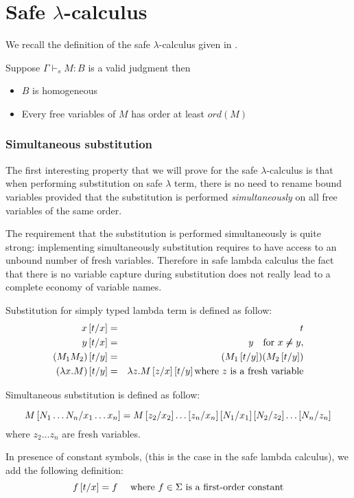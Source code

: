 \chapter{Safe $\lambda$-calculus}

We recall the definition of the safe $\lambda$-calculus given in
\cite{Ong2005}.




\begin{lem}
\label{lem:safe_basic_prop} Suppose $\Gamma \vdash_s M : B$ is a
valid judgment then

\begin{itemize}
\item $B$ is homogeneous
\item Every free variables of $M$ has order at least $ord(M)$
\end{itemize}
\end{lem}


\subsection{Simultaneous substitution}

The first interesting property that we will prove for the safe
$\lambda$-calculus is that when performing substitution on safe
$\lambda$ term, there is no need to rename bound variables provided
that the substitution is performed \emph{simultaneously} on all free
variables of the same order.

The requirement that the substitution is performed simultaneously is
quite strong: implementing simultaneously substitution requires to
have access to an unbound number of fresh variables. Therefore in
safe lambda calculus the fact that there is no variable capture
during substitution does not really lead to a complete economy of
variable names.


\begin{dfn}
Substitution for simply typed lambda term is defined as follow:
\begin{eqnarray*}
x \left[ t/x \right] &=& t\\
 y\left[ t/x \right] &=& y \quad \mbox{for } x \not \neq y,\\
(M_1 M_2) \left[ t/y \right] &=& (M_1 \left[ t/y \right]) (M_2 \left[ t/y \right])\\
(\lambda x . M) \left[ t/y \right] &=& \lambda z . M \left[ z/x \right]
\left[ t/y \right] \mbox{where $z$ is a fresh variable}
\end{eqnarray*}

Simultaneous substitution is defined as follow:

$$M\left[ N_1 \ldots N_n/x_1 \ldots x_n \right] = M \left[ z_2/x_2 \right] \ldots \left[ z_n/x_n \right] \left[ N_1/x_1 \right] \left[ N_2/z_2 \right] \ldots \left[ N_n/z_n \right] $$
where $z_2 \ldots z_n$ are fresh variables.


In presence of constant symbols, (this is the case in the safe
lambda calculus), we add the following definition:
$$f \left[ t/x \right] = f \quad \mbox{ where $f \in \Sigma$ is a first-order constant}$$

\end{dfn}

